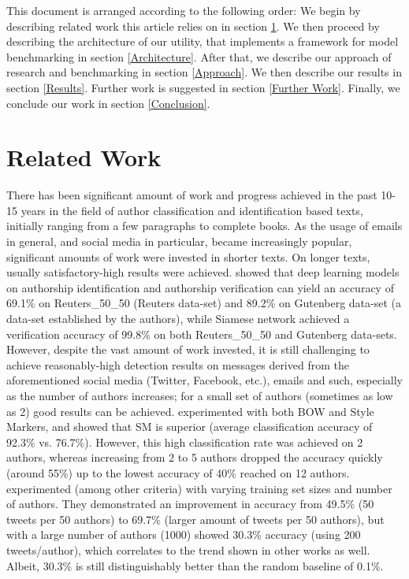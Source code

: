\documentclass[a4paper]{article}
\begin{document}
This document is arranged according to the following order:
We begin by describing related work this article relies on in section \ref{Related Work}.
We then proceed by describing the architecture of our utility, that implements a framework for model benchmarking in section \ref{Architecture}.
After that, we describe our approach of research and benchmarking in section \ref{Approach}.
We then describe our results in section \ref{Results}.
Further work is suggested in section \ref{Further Work}.
Finally, we conclude our work in section \ref{Conclusion}.
\section{Related Work}
\label{Related Work}

There has been significant amount of work and progress achieved in the past 10-15 years in the field of author classification and identification based texts, initially ranging from a few paragraphs to complete books. As the usage of emails in general, and social media in particular, became increasingly popular, significant amounts of work were invested in shorter texts.
On longer texts, usually satisfactory-high results were achieved. \citep{qian} showed that deep learning models on authorship identification and authorship verification can yield an accuracy of 69.1\% on Reuters\_50\_50 (Reuters data-set) and 89.2\% on Gutenberg data-set (a data-set established by the authors), while Siamese network achieved a verification accuracy of 99.8\% on both Reuters\_50\_50 and Gutenberg data-sets.\\
However, despite the vast amount of work invested, it is still challenging to achieve reasonably-high detection results on messages derived from the aforementioned social media (Twitter, Facebook, etc.), emails and such, especially as the number of authors increases; for a small set of authors (sometimes as low as 2) good results can be achieved. \citep{green} experimented with both BOW and Style Markers, and showed that SM is superior (average classification accuracy of 92.3\% vs. 76.7\%). However, this high classification rate was achieved on 2 authors, whereas increasing from 2 to 5 authors dropped the accuracy quickly (around 55\%) up to the lowest accuracy of 40\% reached on 12 authors.
\citep{schwartz} experimented (among other criteria) with varying training set sizes and number of authors. They demonstrated an improvement in accuracy from 49.5\% (50 tweets per 50 authors) to 69.7\% (larger amount of tweets per 50 authors), but with a large number of authors (1000) showed 30.3\% accuracy (using 200 tweets/author), which correlates to the trend shown in other works as well. Albeit, 30.3\% is still  distinguishably better than the random baseline of 0.1\%.
\end{document}
